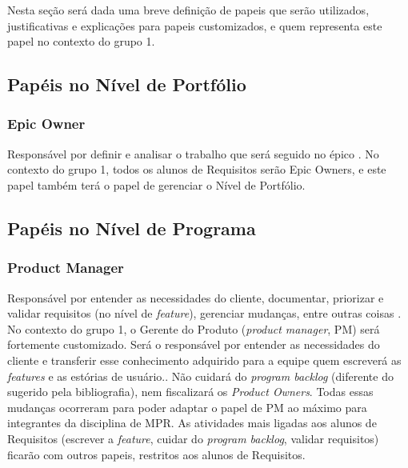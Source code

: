 Nesta seção será dada uma breve definição de papeis que serão utilizados, justificativas e explicações para papeis customizados, e quem representa este papel no contexto do grupo 1.

\subsection{Papéis no Nível de Portfólio}
\subsubsection{Epic Owner}
Responsável por definir e analisar o trabalho que será seguido no épico \cite[p. 418-419]{safe001}. No contexto do grupo 1, todos os alunos de Requisitos serão Epic Owners, e este papel também terá o papel de gerenciar o Nível de Portfólio.


\subsection{Papéis no Nível de Programa}

\subsubsection{Product Manager}
Responsável por entender as necessidades do cliente, documentar, priorizar e validar requisitos (no nível de \emph{feature}), gerenciar mudanças, entre outras coisas \cite[p. 283-287]{safe001}. No contexto do grupo 1, o Gerente do Produto (\emph{product manager}, PM) será fortemente customizado. Será o responsável por entender as necessidades do cliente e transferir esse conhecimento adquirido para a equipe quem escreverá as \emph{features} e as estórias de usuário.. Não cuidará do \emph{program backlog} (diferente do sugerido pela bibliografia), nem fiscalizará os \emph{Product Owners}. Todas essas mudanças ocorreram para poder adaptar o papel de PM ao máximo para integrantes da disciplina de MPR. As atividades mais ligadas aos alunos de Requisitos (escrever a \emph{feature}, cuidar do \emph{program backlog}, validar requisitos) ficarão com outros papeis, restritos aos alunos de Requisitos.

